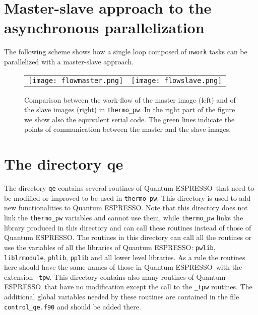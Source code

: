 \documentclass[12pt,a4paper,twoside]{report}
\def\qe{{\sc Quantum ESPRESSO}}
\begin{document}
\newpage
{\color{dark-blue}\chapter{Master-slave approach to the asynchronous 
parallelization}}
\color{black}

The following scheme shows how a single loop composed of \texttt{nwork} tasks
can be parallelized with a master-slave approach.

\begin{center}
\begin{figure}[h]
  \begin{tabular}[t]{ll}
    \texttt{[image: flowmaster.png]}
    &\texttt{[image: flowslave.png]}\\
  \end{tabular}
 \caption{Comparison between the work-flow of the master image (left)
 and of the slave images (right) in \texttt{thermo\_pw}. In the right
part of the figure we show also the equivalent serial code. The green lines
indicate the points of communication between the master and the slave images.
}
\label{figflow}
\end{figure}
\end{center}

\newpage
{\color{dark-blue}\chapter{The directory qe}}
\color{black}

The directory \texttt{qe} contains several routines of \qe\ that need to
be modified or improved to be used in \texttt{thermo\_pw}. This
directory is used to add new functionalities to \qe. Note that this directory
does not link the \texttt{thermo\_pw} variables and cannot use them, while
\texttt{thermo\_pw} links the library produced in this directory and can
call these routines instead of those of \qe. The routines in this directory
can call all the routines or use the variables of all the libraries
of \qe: \texttt{pwlib}, \texttt{liblrmodule},
\texttt{phlib}, \texttt{pplib} and all lower level libraries.
As a rule the routines here should have the same names of those in \qe\ with
the extension \texttt{\_tpw}. This directory contains also many routines
of \qe\ that have no modification except the call to the \texttt{\_tpw}
routines. The additional global variables needed by these routines are
contained in the file \texttt{control\_qe.f90} and should be added there.
\end{document}
